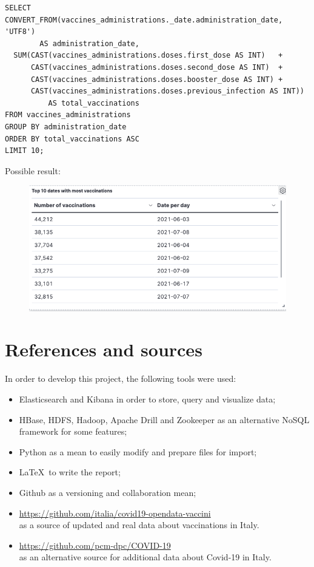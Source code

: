 \documentclass[12pt, a4paper]{article}
\begin{document}
\begin{tcolorbox}[fontupper=\scriptsize]
  \begin{verbatim}
SELECT CONVERT_FROM(vaccines_administrations._date.administration_date, 'UTF8') 
        AS administration_date,
  SUM(CAST(vaccines_administrations.doses.first_dose AS INT)   + 
      CAST(vaccines_administrations.doses.second_dose AS INT)  + 
      CAST(vaccines_administrations.doses.booster_dose AS INT) +
      CAST(vaccines_administrations.doses.previous_infection AS INT)) 
          AS total_vaccinations
FROM vaccines_administrations
GROUP BY administration_date
ORDER BY total_vaccinations ASC
LIMIT 10;
  \end{verbatim}
\end{tcolorbox}

\noindent
Possible result:
\begin{figure}[ht]
  \centering
  \includegraphics[width=\linewidth]{hbase_query_3.png}
\end{figure}

\clearpage

\section{References and sources}

In order to develop this project, the following tools were used:

\begin{itemize}
    \item Elasticsearch and Kibana in order to store, query and visualize data;
    \item HBase, HDFS, Hadoop, Apache Drill and Zookeeper as an alternative NoSQL 
      framework for some features;
    \item Python as a mean to easily modify and prepare files for import;
    \item \LaTeX~to write the report;
    \item Github as a versioning and collaboration mean;
    \item \url{https://github.com/italia/covid19-opendata-vaccini} \\
        as a source of updated and real data about vaccinations in Italy.
    \item \url{https://github.com/pcm-dpc/COVID-19} \\
        as an alternative source for additional data about Covid-19 in Italy.
\end{itemize}

\clearpage
\end{document}
